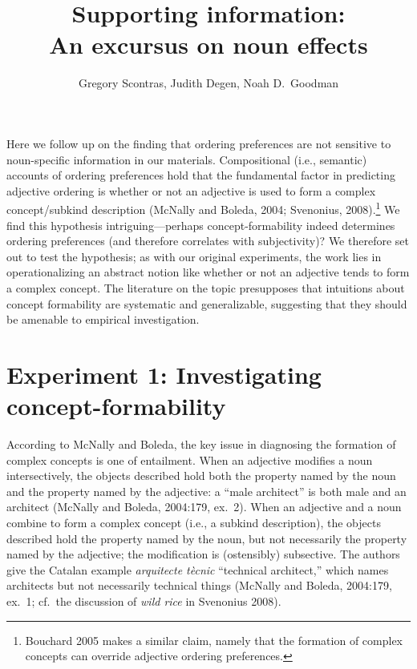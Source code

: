 \documentclass[12pt]{article}
\title{Supporting information:\\ An excursus on noun effects}
\author{Gregory Scontras, Judith Degen, Noah D.~Goodman}
\date{}
\begin{document}
\maketitle

Here we follow up on the finding that ordering preferences are not sensitive to noun-specific information in our materials. Compositional (i.e., semantic) accounts of ordering preferences hold that the fundamental factor in predicting adjective ordering is whether or not an adjective is used to form a complex concept/subkind description (McNally and Boleda, 2004; Svenonius, 2008).\footnote{Bouchard 2005 makes a similar claim, namely that the formation of complex concepts can override adjective ordering preferences.} 
We find this hypothesis intriguing---perhaps concept-formability indeed determines ordering preferences (and therefore correlates with subjectivity)?
We therefore set out to test the hypothesis; as with our original experiments, the work lies in operationalizing an abstract notion like whether or not an adjective tends to form a complex concept. The literature on the topic  presupposes that intuitions about concept formability are systematic and generalizable, suggesting that they should be amenable to empirical investigation.

\section{Experiment 1: Investigating concept-formability}

According to McNally and Boleda, the key issue in diagnosing the formation of complex concepts is one of entailment. When an adjective modifies a noun intersectively, the objects described hold both the property named by the noun and the property named by the adjective: a ``male architect'' is both male and an architect (McNally and Boleda, 2004:179, ex.~2). When an adjective and a noun combine to form a complex concept (i.e., a subkind description), the objects described hold the property named by the noun, but not necessarily the property named by the adjective; the modification is (ostensibly) subsective. The authors give the Catalan example \emph{arquitecte t\`{e}cnic} ``technical architect,'' which names architects but not necessarily technical things (McNally and Boleda, 2004:179, ex.~1; cf.~the discussion of \emph{wild rice} in Svenonius 2008). 
\end{document}
